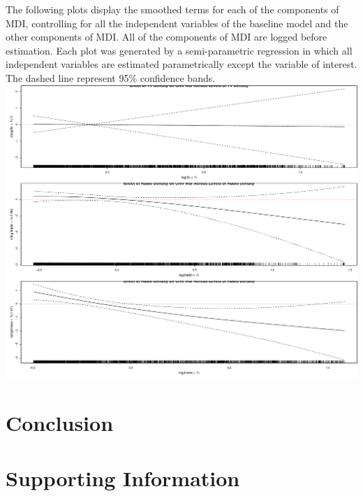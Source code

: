 \documentclass[11pt,article,oneside]{memoir}
\makeatletter
\def\maxwidth{\ifdim\Gin@nat@width>\linewidth\linewidth
\else\Gin@nat@width\fi}
\let\Oldincludegraphics\includegraphics
\renewcommand{\includegraphics}[1]{\Oldincludegraphics[width=\maxwidth]{#1}}
\makeatother
\begin{document}
\clearpage

The following plots display the smoothed terms for each of the
components of MDI, controlling for all the independent variables of the
baseline model and the other components of MDI. All of the components of
MDI are logged before estimation. Each plot was generated by a
semi-parametric regression in which all independent variables are
estimated parametrically except the variable of interest. The dashed
line represent 95\% confidence bands.
\includegraphics{figure/disaggregated-nonlinear.pdf} \pagebreak   

\section{Conclusion}\label{conclusion}

\section{Supporting Information}\label{supporting-information}
\end{document}
